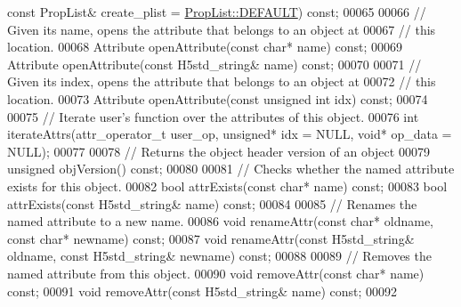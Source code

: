 \begin{DoxyCode}
{      const} PropList& create\_plist = \hyperlink{class_h5_1_1_prop_list_ae52af66ce82af0ea7e6dc57148c56241}{PropList::DEFAULT}) \textcolor{keyword}{const};
00065 
00066         \textcolor{comment}{// Given its name, opens the attribute that belongs to an object at}
00067         \textcolor{comment}{// this location.}
00068         Attribute openAttribute(\textcolor{keyword}{const} \textcolor{keywordtype}{char}* name) \textcolor{keyword}{const};
00069         Attribute openAttribute(\textcolor{keyword}{const} H5std\_string& name) \textcolor{keyword}{const};
00070 
00071         \textcolor{comment}{// Given its index, opens the attribute that belongs to an object at}
00072         \textcolor{comment}{// this location.}
00073         Attribute openAttribute(\textcolor{keyword}{const} \textcolor{keywordtype}{unsigned} \textcolor{keywordtype}{int} idx) \textcolor{keyword}{const};
00074 
00075         \textcolor{comment}{// Iterate user's function over the attributes of this object.}
00076         \textcolor{keywordtype}{int} iterateAttrs(attr\_operator\_t user\_op, \textcolor{keywordtype}{unsigned}* idx = NULL, \textcolor{keywordtype}{void}* op\_data = NULL);
00077 
00078         \textcolor{comment}{// Returns the object header version of an object}
00079         \textcolor{keywordtype}{unsigned} objVersion() \textcolor{keyword}{const};
00080 
00081         \textcolor{comment}{// Checks whether the named attribute exists for this object.}
00082         \textcolor{keywordtype}{bool} attrExists(\textcolor{keyword}{const} \textcolor{keywordtype}{char}* name) \textcolor{keyword}{const};
00083         \textcolor{keywordtype}{bool} attrExists(\textcolor{keyword}{const} H5std\_string& name) \textcolor{keyword}{const};
00084 
00085         \textcolor{comment}{// Renames the named attribute to a new name.}
00086         \textcolor{keywordtype}{void} renameAttr(\textcolor{keyword}{const} \textcolor{keywordtype}{char}* oldname, \textcolor{keyword}{const} \textcolor{keywordtype}{char}* newname) \textcolor{keyword}{const};
00087         \textcolor{keywordtype}{void} renameAttr(\textcolor{keyword}{const} H5std\_string& oldname, \textcolor{keyword}{const} H5std\_string& newname) \textcolor{keyword}{const};
00088 
00089         \textcolor{comment}{// Removes the named attribute from this object.}
00090         \textcolor{keywordtype}{void} removeAttr(\textcolor{keyword}{const} \textcolor{keywordtype}{char}* name) \textcolor{keyword}{const};
00091         \textcolor{keywordtype}{void} removeAttr(\textcolor{keyword}{const} H5std\_string& name) \textcolor{keyword}{const};
00092 

\end{DoxyCode}
